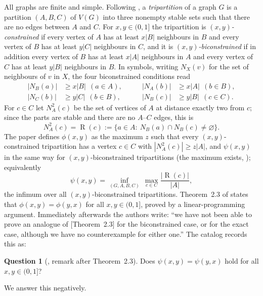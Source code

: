 \documentclass[11pt,a4paper]{article}
\theoremstyle{plain}
\theoremstyle{definition}
\newtheorem{question}[theorem]{Question}
\theoremstyle{remark}
\newcommand{\NB}{N_B}
\newcommand{\NA}{N_A}
\newcommand{\NC}{N_C}
\DeclareMathOperator{\reach}{R}
\begin{document}
All graphs are finite and simple. Following \cite{CHSSS}, a \emph{tripartition} of a graph $G$ is a partition $(A,B,C)$ of $V(G)$ into three nonempty stable sets such that there are no edges between $A$ and $C$. For $x,y\in(0,1]$ the tripartition is \emph{$(x,y)$-constrained} if every vertex of $A$ has at least $x|B|$ neighbours in $B$ and every vertex of $B$ has at least $y|C|$ neighbours in $C$, and it is \emph{$(x,y)$-biconstrained} if in addition every vertex of $B$ has at least $x|A|$ neighbours in $A$ and every vertex of $C$ has at least $y|B|$ neighbours in $B$. In symbols, writing $N_X(v)$ for the set of neighbours of $v$ in $X$, the four biconstrained conditions read
\begin{equation}\label{eq:bic}
\begin{aligned}
 |\NB(a)|&\ge x|B|\ \ (a\in A),&\qquad |\NA(b)|&\ge x|A|\ \ (b\in B),\\
 |\NC(b)|&\ge y|C|\ \ (b\in B),&\qquad |\NB(c)|&\ge y|B|\ \ (c\in C).
\end{aligned}
\end{equation}
For $c\in C$ let $N^2_A(c)$ be the set of vertices of $A$ at distance exactly two from $c$; since the parts are stable and there are no $A$--$C$ edges, this is
\[
 N^2_A(c)=\reach(c):=\{a\in A:\ \NB(a)\cap\NB(c)\ne\varnothing\}.
\]
The paper defines $\phi(x,y)$ as the maximum $z$ such that every $(x,y)$-constrained tripartition has a vertex $c\in C$ with $|N^2_A(c)|\ge z|A|$, and $\psi(x,y)$ in the same way for $(x,y)$-biconstrained tripartitions (the maximum exists, \cite[Theorem~2.1]{CHSSS}); equivalently
\begin{equation}\label{eq:psi}
 \psi(x,y)=\inf_{(G,A,B,C)}\ \max_{c\in C}\frac{|\reach(c)|}{|A|},
\end{equation}
the infimum over all $(x,y)$-biconstrained tripartitions. Theorem~2.3 of \cite{CHSSS} states that $\phi(x,y)=\phi(y,x)$ for all $x,y\in(0,1]$, proved by a linear-programming argument. Immediately afterwards the authors write: ``we have not been able to prove an analogue of [Theorem~2.3] for the biconstrained case, or for the exact case, although we have no counterexample for either one.'' The catalog records this as:

\begin{question}[{\cite{CHSSS}, remark after Theorem~2.3}]\label{q:sym}
Does $\psi(x,y)=\psi(y,x)$ hold for all $x,y\in(0,1]$?
\end{question}

We answer this negatively.
\end{document}
